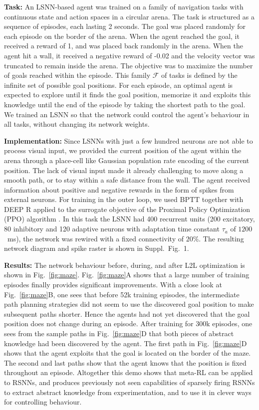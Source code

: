 \documentclass{article} \pdfoutput=1
\begin{document}
\textbf{Task:} An LSNN-based agent was trained on a family of navigation tasks with continuous state and action spaces in a circular arena. The task is structured as a sequence of episodes, each lasting 2 seconds.
The goal was placed randomly for each episode on the border of the arena.
When the agent reached the goal, it received a reward of 1, and was placed back randomly in the arena.
When the agent hit a wall, it received a negative reward of -0.02 and the velocity vector was truncated to remain inside the arena.
The objective was to maximize the number of goals reached within the episode.
This family $\mathcal{F}$ of tasks is defined by the infinite set of possible goal positions.
For each episode, an optimal agent is expected to explore until it finds the goal position, memorize it and exploits this knowledge until the end of the episode by taking the shortest path to the goal. We trained an LSNN so that the network could control the agent's behaviour in all tasks, without changing its network weights.



\textbf{Implementation:}
Since LSNNs with just a few hundred neurons are not able to process visual input,
we provided the current position of the agent within the arena through a place-cell like Gaussian population rate encoding of the current position.
The lack of visual input made it already challenging to move along a smooth path, or to stay within a safe distance from the wall. 
The agent received information about positive and negative rewards in the form of spikes from external neurons.
For training in the outer loop, we used BPTT together with DEEP R applied to the surrogate objective of the Proximal Policy Optimization (PPO) algorithm \cite{schulman2017proximal}. 
In this task the LSNN had 400 recurrent units (200 excitatory, 80 inhibitory and 120 adaptive neurons with adaptation time constant $\tau_a$ of $1200$~ms), the network was rewired with a fixed connectivity of $20\%$. The resulting network diagram and spike raster is shown in Suppl.~Fig.~1.


\textbf{Results:} The network behaviour before, during, and after L2L optimization is shown in Fig.~\ref{fig:maze}.
Fig.~\ref{fig:maze}A shows that a large number of training episodes finally provides significant improvements.
With a close look at Fig.~\ref{fig:maze}B, one sees that before 52k training episodes, the intermediate path planning strategies did not seem to use the discovered goal position to make subsequent paths shorter.
Hence the agents had not yet discovered that the goal position does not change during an episode.
After training for 300k episodes, one sees from the sample paths in Fig.~\ref{fig:maze}D that both pieces of abstract knowledge had been discovered by the agent. The first path in Fig.~\ref{fig:maze}D shows that the agent exploits that the goal is located on the border of the maze. The second and last paths show that the agent knows that the position is fixed throughout an episode.
Altogether this demo shows that meta-RL can be applied to RSNNs, and produces previously not seen capabilities of sparsely firing RSNNs to extract abstract knowledge from experimentation, and to use it in clever ways for controlling behaviour.
\end{document}
